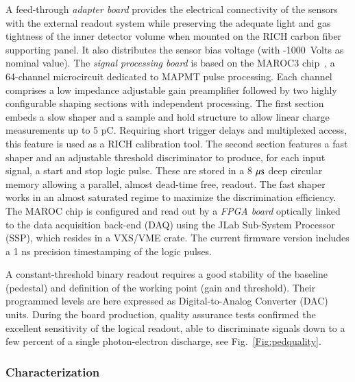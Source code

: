 \documentclass[final,5p,times,twocolumn]{elsarticle}
\begin{document}
A feed-through {\it adapter board} provides the electrical connectivity of the sensors with the external readout 
system while preserving the adequate light and gas tightness of the inner detector volume when mounted on the 
RICH carbon fiber supporting panel. It also distributes the sensor bias voltage (with -1000~Volts as
nominal value). The {\it signal processing board} is based on the MAROC3 
chip~\cite{MAROC3:chip}, a 64-channel microcircuit dedicated to MAPMT pulse processing. Each channel comprises
a low impedance adjustable gain preamplifier followed by two highly configurable shaping sections with independent processing. 
The first section embeds a slow shaper and a sample and hold structure to allow linear charge measurements up to 5 pC.
Requiring short trigger delays and multiplexed access, this feature is used as a RICH calibration tool.  
The second section features a fast shaper and an adjustable threshold discriminator to produce, for each input signal, a 
start and stop logic pulse.
These are stored in a 8 $\rm \mu s$ deep circular memory allowing a parallel, almost 
dead-time free, readout. The fast shaper works in an almost saturated regime to maximize the discrimination efficiency. 
The MAROC chip is configured and read out by a {\it FPGA board} optically linked to the data acquisition back-end (DAQ) 
using the JLab Sub-System Processor (SSP), which resides in a VXS/VME crate.
The current firmware version includes a 1 ns precision timestamping of the logic pulses.


A constant-threshold binary readout requires a good stability of the baseline (pedestal) and definition of the
working point (gain and threshold). Their programmed levels are here expressed as Digital-to-Analog Converter (DAC) units. 
During the board production, quality assurance tests confirmed the excellent sensitivity 
of the logical readout, able to discriminate signals down to a few percent of a single photon-electron discharge,
see Fig.~\ref{Fig:pedquality}.


\subsubsection{Characterization}
\end{document}
